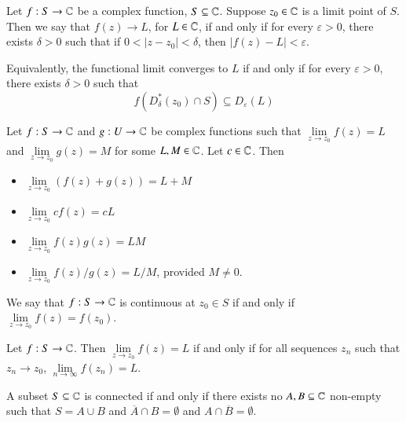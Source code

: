 \begin{definition}
    Let $f:S\rightarrow \mathbb C$ be a complex function, $S \subseteq \mathbb C$. Suppose $z_0 \in \mathbb C$ is a limit point of $S$. Then we say that $f(z) \rightarrow L$, for $L \in \mathbb C$, if and only if for every $\varepsilon > 0$, there exists $\delta > 0$ such that if $0 < |z-z_0| < \delta$, then $|f(z) - L| < \varepsilon$. 


    Equivalently, the functional limit converges to $L$ if and only if for every $\varepsilon > 0$, there exists $\delta > 0$ such that \begin{equation*}
        f(D_{\delta}^*(z_0)\cap S) \subseteq D_{\varepsilon}(L)
    \end{equation*}
\end{definition}


\begin{theorem}
    Let $f:S\rightarrow \mathbb C$ and $g:U\rightarrow \mathbb C$ be complex functions such that $\lim\limits_{z\rightarrow z_0}f(z) = L$ and $\lim\limits_{z\rightarrow z_0}g(z) = M$ for some $L,M \in \mathbb C$. Let $c \in \mathbb C$. Then\begin{itemize}
        \item $\lim\limits_{z\rightarrow z_0}(f(z)+g(z)) = L+M$
        \item $\lim\limits_{z\rightarrow z_0}cf(z) = cL$
        \item $\lim\limits_{z\rightarrow z_0}f(z)g(z) = LM$
        \item $\lim\limits_{z\rightarrow z_0}f(z)/g(z) = L/M$, provided $M \neq 0$.
    \end{itemize}
\end{theorem}

\begin{definition}
    We say that $f:S\rightarrow \mathbb C$ is continuous at $z_0 \in S$ if and only if $\lim\limits_{z\rightarrow z_0}f(z) = f(z_0)$.
\end{definition}

\begin{theorem}
    Let $f:S\rightarrow \mathbb C$. Then $\lim\limits_{z\rightarrow z_0}f(z) = L$ if and only if for all sequences $z_n$ such that $z_n\rightarrow z_0$, $\lim\limits_{n\rightarrow\infty}f(z_n) = L$.
\end{theorem}


\begin{definition}
    A subset $S \subseteq \mathbb C$ is connected if and only if there exists no $A,B\subseteq \mathbb C$ non-empty such that $S = A\cup B$ and $\overline{A}\cap B = \emptyset$ and $A\cap \overline{B} = \emptyset$.
\end{definition}

